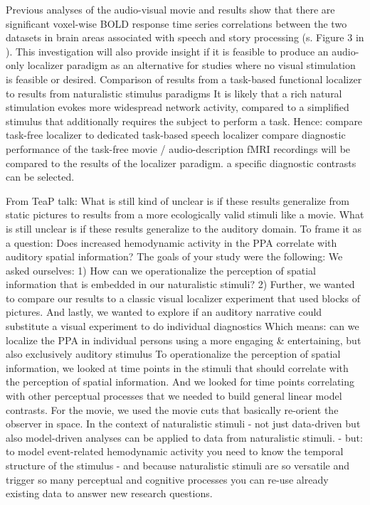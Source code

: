 %
Previous analyses of the audio-visual movie and results show that there are significant voxel-wise BOLD response time
series correlations between the two datasets in brain areas associated with
speech and story processing (s. Figure 3 in \citep{hanke2016simultaneous}).
%
This investigation will also provide insight if it is feasible to produce an
audio-only localizer paradigm as an alternative for studies where no visual
stimulation is feasible or desired.
%
Comparison of results from a task-based functional localizer to
results from naturalistic stimulus paradigms
%
It is likely that a rich natural stimulation evokes more widespread network
activity, compared to a simplified stimulus that additionally requires the
subject to perform a task.
%
Hence: compare task-free localizer to dedicated task-based speech localizer
%
compare diagnostic performance of the task-free movie / audio-description fMRI
recordings will be compared to the results of the localizer paradigm.
%
a specific diagnostic contrasts can be selected.

From TeaP talk:
%
What is still kind of unclear is if these results generalize from static
pictures to results from a more ecologically valid stimuli like a movie.
%
What is still unclear is if these results generalize to the auditory domain.  To
frame it as a question: Does increased hemodynamic activity in the PPA correlate
with auditory spatial information?
%
The goals of your study were the following: We asked ourselves:
%
1) How can we operationalize the perception of spatial information that is
embedded in our naturalistic stimuli?
%
2) Further, we wanted to compare our results to a classic visual localizer
experiment that used blocks of pictures.
%
And lastly, we wanted to explore if an auditory narrative could substitute a
visual experiment to do individual diagnostics
%
Which means: can we localize the PPA in individual persons using a more engaging
\& entertaining, but also exclusively auditory stimulus
%
To operationalize the perception of spatial information, we looked at time
points in the stimuli that should correlate with the perception of spatial
information.
%
And we looked for time points correlating with other perceptual processes that
we needed to build general linear model contrasts.
%
For the movie, we used the movie cuts that basically re-orient the observer in
space.
%
In the context of naturalistic stimuli - not just data-driven but also
model-driven analyses can be applied to data from naturalistic stimuli.
%
- but: to model event-related hemodynamic activity you need to know the temporal
structure of the stimulus
%
- and because naturalistic stimuli are so versatile and trigger so many
perceptual and cognitive processes you can re-use already existing data to
answer new research questions.


